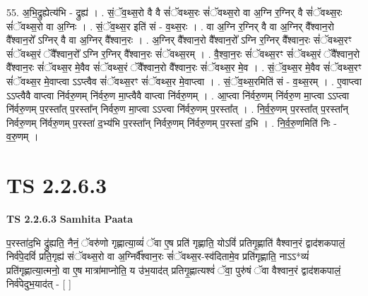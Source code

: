 \documentclass[17pt]{extarticle}
\begin{document}
55. अ॒भि॒द्रुह्येत्य॑भि - द्रुह्य॑ । . सं॒ॅव॒थ्स॒रो वै वै सं॑ॅवथ्स॒रः सं॑ॅवथ्स॒रो वा अ॒ग्नि र॒ग्निर् वै सं॑ॅवथ्स॒रः सं॑ॅवथ्स॒रो वा अ॒ग्निः । . सं॒ॅव॒थ्स॒र इति॑ सं - व॒थ्स॒रः । . वा अ॒ग्नि र॒ग्निर् वै वा अ॒ग्निर् वै᳚श्वान॒रो वै᳚श्वान॒रो᳚ ऽग्निर् वै वा अ॒ग्निर् वै᳚श्वान॒रः । . अ॒ग्निर् वै᳚श्वान॒रो वै᳚श्वान॒रो᳚ ऽग्नि र॒ग्निर् वै᳚श्वान॒रः सं॑ॅवथ्स॒रꣳ सं॑ॅवथ्स॒रं ॅवै᳚श्वान॒रो᳚ ऽग्नि र॒ग्निर् वै᳚श्वान॒रः सं॑ॅवथ्स॒रम् । . वै॒श्वा॒न॒रः सं॑ॅवथ्स॒रꣳ सं॑ॅवथ्स॒रं ॅवै᳚श्वान॒रो वै᳚श्वान॒रः सं॑ॅवथ्स॒र मे॒वैव सं॑ॅवथ्स॒रं ॅवै᳚श्वान॒रो वै᳚श्वान॒रः सं॑ॅवथ्स॒र मे॒व । . सं॒ॅव॒थ्स॒र मे॒वैव सं॑ॅवथ्स॒रꣳ सं॑ॅवथ्स॒र मे॒वाप्त्वा ऽऽप्त्वैव सं॑ॅवथ्स॒रꣳ सं॑ॅवथ्स॒र मे॒वाप्त्वा । . सं॒ॅव॒थ्स॒रमिति॑ सं - व॒थ्स॒रम् । . ए॒वाप्त्वा ऽऽप्त्वैवै वाप्त्वा नि॑र्वरु॒णम् नि॑र्वरु॒ण मा॒प्त्वैवै वाप्त्वा नि॑र्वरु॒णम् । . आ॒प्त्वा नि॑र्वरु॒णम् नि॑र्वरु॒ण मा॒प्त्वा ऽऽप्त्वा नि॑र्वरु॒णम् प॒रस्ता᳚त् प॒रस्ता᳚न् निर्वरु॒ण मा॒प्त्वा ऽऽप्त्वा नि॑र्वरु॒णम् प॒रस्ता᳚त् । . नि॒र्व॒रु॒णम् प॒रस्ता᳚त् प॒रस्ता᳚न् निर्वरु॒णम् नि॑र्वरु॒णम् प॒रस्ता॑ द॒भ्य॑भि प॒रस्ता᳚न् निर्वरु॒णम् नि॑र्वरु॒णम् प॒रस्ता॑ द॒भि । . नि॒र्व॒रु॒णमिति॑ निः - व॒रु॒णम् । \newline
\pagebreak
{}
\section*{ TS 2.2.6.3 }

\textbf{TS 2.2.6.3 } \newline
\textbf{Samhita Paata} \newline

प॒रस्ता॑द॒भि द्रु॑ह्यति॒ नैनं॒ ॅवरु॑णो गृह्णात्या॒व्यं॑ ॅवा ए॒ष प्रति॑ गृह्णाति॒ योऽविं॑ प्रतिगृ॒ह्णाति॑ वैश्वान॒रं द्वाद॑शकपालं॒ निर्व॑पे॒दविं॑ प्रति॒गृह्य॑ संॅवथ्स॒रो वा अ॒ग्निर्वै᳚श्वान॒रः सं॑ॅवथ्स॒र-स्व॑दितामे॒व प्रति॑गृह्णाति॒ नाऽऽ*व्यं॑ प्रति॑गृह्णात्या॒त्मनो॒ वा ए॒ष मात्रा॑माप्नोति॒ य उ॑भ॒याद॑त् प्रतिगृ॒ह्णात्यश्वं॑ ॅवा॒ पुरु॑षं ॅवा वैश्वान॒रं द्वाद॑शकपालं॒ निर्व॑पेदुभ॒याद॑त् - [  ] \newline
\end{document}
